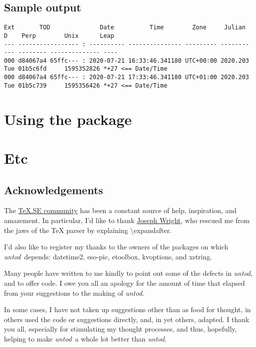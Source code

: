 \documentclass[a4paper,10pt,twoside,openany]{memoir}
\newcommand{\sfit}[1]{\textit{#1}}
\newcommand{\opname}{\sfit{untod}}
\newcommand{\tpname}{\sfit{untod}}
\begin{document}
\section{Sample output}
\begin{lstlisting}[style=zterm]
Ext       TOD              Date          Time        Zone     Julian   D    Perp        Unix      Leap
--- ----------------- : ---------- --------------- --------- -------- --- -------- -------------- ----
000 d84067a4 65ffc--- : 2020-07-21 16:33:46.341180 UTC+00:00 2020.203 Tue 01b5c6fd     1595352826 *+27 <== Date/Time
000 d84067a4 65ffc--- : 2020-07-21 17:33:46.341180 UTC+01:00 2020.203 Tue 01b5c739     1595356426 *+27 <== Date/Time
\end{lstlisting}
    
\chapter{Using the package}
\chapter{Etc}
\clearpage
\section{Acknowledgements}

The \href{http://tex.stackexchange.com}{\TeX.SE community}
has been a constant source of help, inspiration, and amazement.
In particular, I'd like to thank
\href{http://tex.stackexchange.com/users/73/joseph-wright}{Joseph Wright},
who rescued me from the jaws of the TeX parser by explaining
\textbackslash expandafter.

I'd also like to register my thanks to the owners of the packages on which
\tpname\ depends: datetime2, eso-pic, etoolbox, kvoptions, and xstring.

Many people have written to me kindly
to point out some of the defects in \opname, and to offer code.
I owe you all an apology for the amount of time that elapsed
from your suggestions to the making of \tpname.

In some cases, I have not taken up suggestions other than as food for thought,
in others used the code or suggestions directly, and,
in yet others, adapted.
I thank you all, especially for stimulating my thought processes,
and thus, hopefully,
helping to make \tpname\ a whole lot better than \opname.
\end{document}
